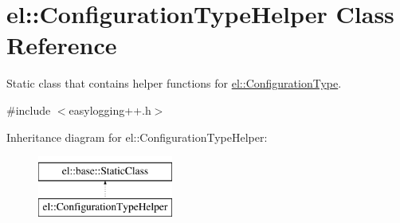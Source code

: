 \hypertarget{classel_1_1ConfigurationTypeHelper}{\section{el\-:\-:Configuration\-Type\-Helper Class Reference}
\label{classel_1_1ConfigurationTypeHelper}
}


Static class that contains helper functions for \hyperlink{namespaceel_a281f5db6d6163678bc68a8b23b59e124}{el\-::\-Configuration\-Type}.  




{\ttfamily \#include $<$easylogging++.\-h$>$}

Inheritance diagram for el\-:\-:Configuration\-Type\-Helper\-:\begin{figure}[H]
\begin{center}
\leavevmode
\includegraphics[height=2.000000cm]{classel_1_1ConfigurationTypeHelper}
\end{center}
\end{figure}
